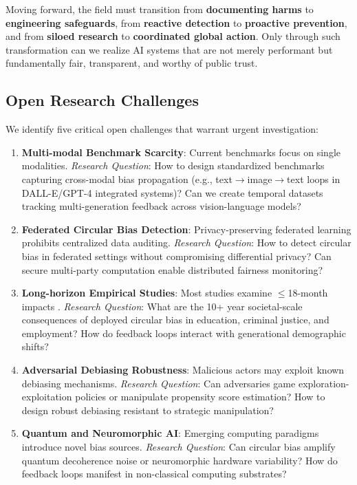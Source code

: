 \documentclass[11pt,a4paper]{article}
\begin{document}
Moving forward, the field must transition from \textbf{documenting harms} to \textbf{engineering safeguards}, from \textbf{reactive detection} to \textbf{proactive prevention}, and from \textbf{siloed research} to \textbf{coordinated global action}. Only through such transformation can we realize AI systems that are not merely performant but fundamentally fair, transparent, and worthy of public trust.

\subsection{Open Research Challenges}

We identify five critical open challenges that warrant urgent investigation:

\begin{enumerate}
    \item \textbf{Multi-modal Benchmark Scarcity}: Current benchmarks focus on single modalities. \textit{Research Question}: How to design standardized benchmarks capturing cross-modal bias propagation (e.g., text$\rightarrow$image$\rightarrow$text loops in DALL-E/GPT-4 integrated systems)? Can we create temporal datasets tracking multi-generation feedback across vision-language models?
    
    \item \textbf{Federated Circular Bias Detection}: Privacy-preserving federated learning prohibits centralized data auditing. \textit{Research Question}: How to detect circular bias in federated settings without compromising differential privacy? Can secure multi-party computation enable distributed fairness monitoring?
    
    \item \textbf{Long-horizon Empirical Studies}: Most studies examine $\leq$18-month impacts \cite{nestor2024}. \textit{Research Question}: What are the 10+ year societal-scale consequences of deployed circular bias in education, criminal justice, and employment? How do feedback loops interact with generational demographic shifts?
    
    \item \textbf{Adversarial Debiasing Robustness}: Malicious actors may exploit known debiasing mechanisms. \textit{Research Question}: Can adversaries game exploration-exploitation policies or manipulate propensity score estimation? How to design robust debiasing resistant to strategic manipulation?
    
    \item \textbf{Quantum and Neuromorphic AI}: Emerging computing paradigms introduce novel bias sources. \textit{Research Question}: Can circular bias amplify quantum decoherence noise or neuromorphic hardware variability? How do feedback loops manifest in non-classical computing substrates?
\end{enumerate}
\end{document}

